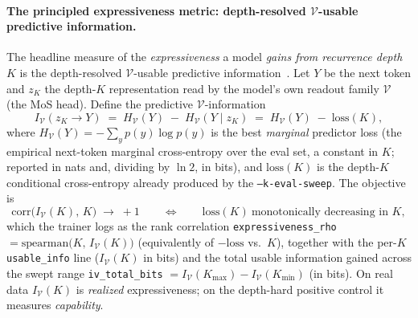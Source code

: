 \documentclass[11pt]{article}
\newcommand{\code}[1]{\texttt{#1}}
\begin{document}
\paragraph{The principled expressiveness metric: depth-resolved \texorpdfstring{$\mathcal{V}$}{V}-usable predictive information.}
\label{par:vinfo}
The headline measure of the \emph{expressiveness} a model \emph{gains from recurrence depth} \(K\) is
the depth-resolved \(\mathcal{V}\)-usable predictive information~\cite{vinfo,vusable}.  Let \(Y\) be
the next token and \(z_K\) the depth-\(K\) representation read by the model's own readout family
\(\mathcal{V}\) (the MoS head).  Define the predictive \(\mathcal{V}\)-information
\begin{equation}
\label{eq:vinfo}
  I_{\mathcal{V}}(z_K\!\to\!Y)
  \;=\; H_{\mathcal{V}}(Y)\;-\;H_{\mathcal{V}}(Y\mid z_K)
  \;=\; H_{\mathcal{V}}(Y)\;-\;\mathrm{loss}(K),
\end{equation}
where \(H_{\mathcal{V}}(Y)=-\sum_y p(y)\log p(y)\) is the best \emph{marginal} predictor loss
(the empirical next-token marginal cross-entropy over the eval set, a constant in \(K\); reported in
nats and, dividing by \(\ln 2\), in bits), and \(\mathrm{loss}(K)\) is the depth-\(K\) conditional
cross-entropy already produced by the \code{--k-eval-sweep}.  The objective is
\begin{equation}
\label{eq:vinfo-obj}
  \mathrm{corr}\bigl(I_{\mathcal{V}}(K),\,K\bigr)\;\to\;+1
  \qquad\Longleftrightarrow\qquad \mathrm{loss}(K)\ \text{monotonically decreasing in }K,
\end{equation}
which the trainer logs as the rank correlation \code{expressiveness\_rho}
\(=\mathrm{spearman}\bigl(K,\,I_{\mathcal{V}}(K)\bigr)\) (equivalently of \(-\mathrm{loss}\) vs.\ \(K\)),
together with the per-\(K\) \code{usable\_info} line (\(I_{\mathcal{V}}(K)\) in bits) and the total
usable information gained across the swept range \code{iv\_total\_bits}
\(=I_{\mathcal{V}}(K_{\max})-I_{\mathcal{V}}(K_{\min})\) (in bits).  On real data \(I_{\mathcal{V}}(K)\)
is \emph{realized} expressiveness; on the depth-hard positive control it measures \emph{capability}.
\end{document}
